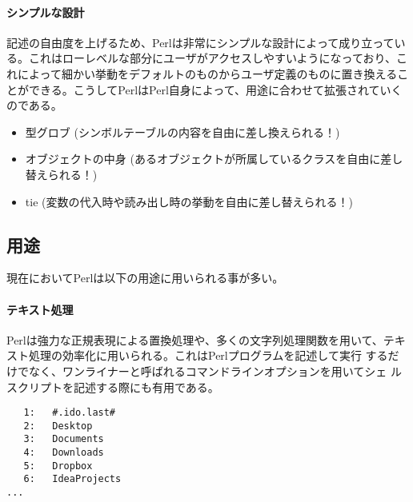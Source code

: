 \documentclass[a4paper,9pt]{jarticle}
\begin{document}
\paragraph{シンプルな設計}
記述の自由度を上げるため、Perlは非常にシンプルな設計によって成り立っている。これはローレベルな部分にユーザがアクセスしやすいようになっており、これによって細かい挙動をデフォルトのものからユーザ定義のものに置き換えることができる。こうしてPerlはPerl自身によって、用途に合わせて拡張されていくのである。
\begin{itemize}
  \item 型グロブ (シンボルテーブルの内容を自由に差し換えられる！)
  \item オブジェクトの中身 (あるオブジェクトが所属しているクラスを自由に差し替えられる！)
  \item tie (変数の代入時や読み出し時の挙動を自由に差し替えられる！)
\end{itemize}
\newpage
\subsection{用途}
現在においてPerlは以下の用途に用いられる事が多い。
\paragraph{テキスト処理}
Perlは強力な正規表現による置換処理や、多くの文字列処理関数を用いて、テキ
スト処理の効率化に用いられる。これはPerlプログラムを記述して実行
するだけでなく、ワンライナーと呼ばれるコマンドラインオプションを用いてシェ
ルスクリプトを記述する際にも有用である。

\begin{lstlisting}[caption=標準入力のソースに行番号を付けて標準出力へ]
% ls | perl -ple 'printf "%4d:\t", $.'
   1:	#.ido.last#
   2:	Desktop
   3:	Documents
   4:	Downloads
   5:	Dropbox
   6:	IdeaProjects
...
\end{lstlisting}　
\end{document}
